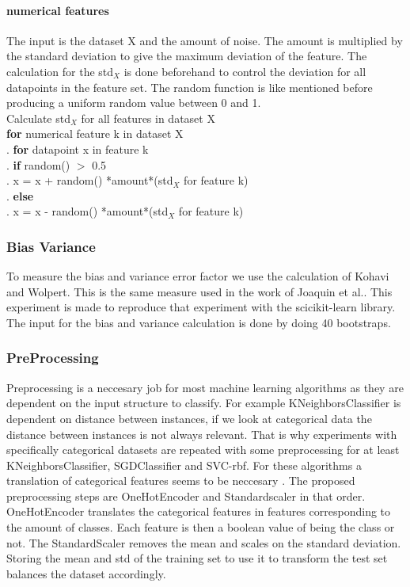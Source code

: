 \documentclass[a4paper,10pt]{article}
\begin{document}
\paragraph{numerical features \newline}
The input is the dataset X and the amount of noise. The amount is multiplied by the standard deviation to give the maximum deviation of the feature. The calculation for the std$_X$ is done beforehand to control the deviation for all datapoints in the feature set. The random function is like mentioned before producing a uniform random value between 0 and 1.\\
Calculate std$_X$ for all features in dataset X\\
\textbf{for} numerical feature k in dataset X\\
.\hspace{1cm} \textbf{for} datapoint x in feature k\\
.\hspace{2cm} \textbf{if} random() $>$ 0.5 \\	
.\hspace{3cm} x = x + random() *amount*(std$_X$ for feature k)\\
.\hspace{2cm} \textbf{else}  \\	
.\hspace{3cm} x = x - random() *amount*(std$_X$ for feature k) 
\\

\subsubsection{Bias Variance}
To measure the bias and variance error factor we use the calculation of Kohavi and Wolpert\cite{BiasCalc}. This is the same measure used in the work of Joaquin et al.\cite{Bias-var}. This experiment is made to reproduce that experiment with the scicikit-learn library. The input for the bias and variance calculation is done by doing 40 bootstraps. 

\subsubsection{PreProcessing}
Preprocessing is a neccesary job for most machine learning algorithms as they are dependent on the input structure to classify. For example KNeighborsClassifier is dependent on distance between instances, if we look at categorical data the distance between instances is not always relevant. That is why experiments with specifically categorical datasets are repeated with some preprocessing for at least KNeighborsClassifier, SGDClassifier and SVC-rbf. For these algorithms a translation of categorical features seems to be neccesary \cite{KNN-Sym}\cite{SVM-sym}. The proposed preprocessing steps are OneHotEncoder and Standardscaler in that order. OneHotEncoder translates the categorical features in features corresponding to the amount of classes. Each feature is then a boolean value of being the class or not. The StandardScaler removes the mean and scales on the standard deviation. Storing the mean and std of the training set to use it to transform the test set balances the dataset accordingly. 
\end{document}
